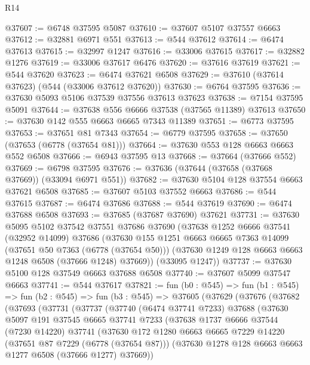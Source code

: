 \begin{lexlean}{R14}
\begin{coremodule}
@37607 := @6748 @37595 @5087
@37610 := @37607 @5107 @37557 @6663
@37612 := @32881 @6971 @551
@37613 := @544 @37612
@37614 := @6474 @37613
@37615 := @32997 @1247
@37616 := @33006 @37615
@37617 := @32882 @1276
@37619 := @33006 @37617 @6476
@37620 := @37616 @37619
@37621 := @544 @37620
@37623 := @6474 @37621 @6508
@37629 := @37610 (@37614 @37623) (@544 (@33006 @37612 @37620))
@37630 := @6764 @37595
@37636 := @37630 @5093 @5106 @37539 @37556 @37613 @37623
@37638 := @7154 @37595 @5091
@37644 := @37638 @556 @6666 @37538 (@37565 @11389) @37613
@37650 := @37630 @142 @555 @6663 @6665 @7343 @11389
@37651 := @6773 @37595
@37653 := @37651 @81 @7343
@37654 := @6779 @37595
@37658 := @37650 (@37653 (@6778 (@37654 @81)))
@37664 := @37630 @553 @128 @6663 @6663 @552 @6508
@37666 := @6943 @37595 @13
@37668 := @37664 (@37666 @552)
@37669 := @6798 @37595
@37676 := @37636 (@37644 (@37658 (@37668 @37669)) (@33094 @6971 @551))
@37682 := @37630 @5104 @128 @37554 @6663 @37621 @6508
@37685 := @37607 @5103 @37552 @6663
@37686 := @544 @37615
@37687 := @6474 @37686
@37688 := @544 @37619
@37690 := @6474 @37688 @6508
@37693 := @37685 (@37687 @37690) @37621
@37731 := @37630
    @5095
    @5102
    @37542
    @37551
    @37686
    @37690
    (@37638
      @1252
      @6666
      @37541
      (@32952 @14099)
      @37686
      (@37630
        @155
        @1251
        @6663
        @6665
        @7363
        @14099
        (@37651 @50 @7363 (@6778 (@37654 @50)))
        (@37630 @1249 @128 @6663 @6663 @1248 @6508 (@37666 @1248) @37669))
      (@33095 @1247))
@37737 := @37630 @5100 @128 @37549 @6663 @37688 @6508
@37740 := @37607 @5099 @37547 @6663
@37741 := @544 @37617
@37821 := fun (b0 : @545) =>
  fun (b1 : @545) =>
  fun (b2 : @545) =>
  fun (b3 : @545) =>
  @37605
    (@37629
      (@37676
        (@37682
          (@37693
            (@37731
              (@37737
                (@37740
                  (@6474 @37741 @7233)
                  @37688
                  (@37630
                    @5097
                    @191
                    @37545
                    @6665
                    @37741
                    @7233
                    (@37638
                      @1737
                      @6666
                      @37544
                      (@7230 @14220)
                      @37741
                      (@37630
                        @172
                        @1280
                        @6663
                        @6665
                        @7229
                        @14220
                        (@37651 @87 @7229 (@6778 (@37654 @87)))
                        (@37630 @1278 @128 @6663 @6663 @1277 @6508 (@37666 @1277) @37669))

\end{coremodule}
\end{lexlean}
